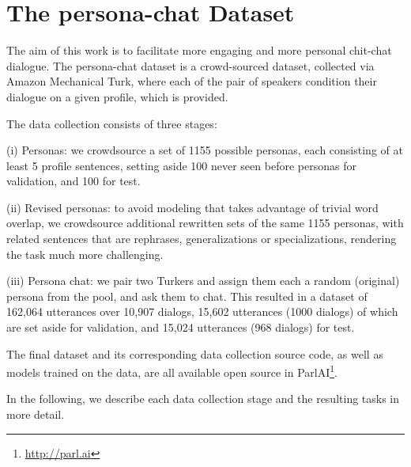 \section{The {\sc persona-chat} Dataset} 

The aim of this work is to facilitate more engaging and more personal chit-chat dialogue. The {\sc persona-chat} dataset is a crowd-sourced dataset, collected via Amazon Mechanical Turk, where each of the pair of speakers condition their dialogue on a given profile, which is provided. 

The data collection consists of three stages:


(i) Personas: we crowdsource a set of 1155 possible personas, each consisting of at least 5 profile sentences, setting aside 100 never seen before personas for validation, and 100 for test.

(ii) Revised personas: to avoid modeling that takes advantage of trivial word overlap, we crowdsource  additional rewritten sets of the same 1155 personas, with related sentences that are rephrases, generalizations or specializations, rendering the task much more challenging.

(iii) Persona chat: we pair two Turkers and assign them each a random (original) persona from the pool, and ask them to chat. This resulted in a dataset of 162,064 utterances over 10,907 dialogs, 15,602 utterances (1000 dialogs) of which are set aside for validation, and 15,024 utterances
(968 dialogs) for test.


The final dataset and its corresponding data collection source  code, as well as models trained on the data, are all available open source in ParlAI\footnote{ {\small{\url{http://parl.ai}}}}.


In the following, we describe each data collection stage and the resulting tasks in more detail.



